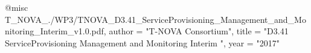 @misc{ T_NOVA_./WP3/TNOVA_D3.41_ServiceProvisioning_Management_and_Monitoring_Interim_v1.0.pdf,
       author = "T-NOVA Consortium",
       title = "D3.41 ServiceProvisioning Management and Monitoring Interim ",
       year = "2017" }
